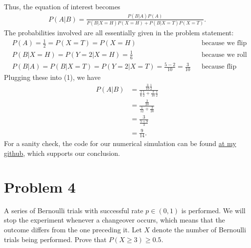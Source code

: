 \documentclass[10pt,a4paper]{article}
\theoremstyle{theorem}
\theoremstyle{definition}
\begin{document}
Thus, the equation of interest becomes
\begin{align}
P(A|B) = \frac{P(B|A) P(A)}{P(B| X = H) P(X = H) + P(B| X = T) P(X = T)}.
\end{align}
The probabilities involved are all essentially given in the problem statement:
\begin{align*}
&P(A) = \frac{1}{2} = P(X = T) = P(X = H) && \text{because we flip a fair coin}\\
&P(B|X = H) = P(Y = 2| X = H) = \frac{1}{6} && \text{because we roll a fair die}\\
&P(B|A) = P(B|X = T) = P(Y = 2| X = T) = \frac{5 - 2}{10} = \frac{3}{10} && \text{because flip our weighted die}
\end{align*}
Plugging these into (1), we have
\begin{align*}
P(A|B) &= \frac{\frac{3}{10} \frac{1}{2}}{\frac{1}{6}  \frac{1}{2} + \frac{3}{10} \frac{1}{2}}\\
&= \frac{\frac{3}{20}}{\frac{1}{12} + \frac{3}{20}}\\
&= \frac{3}{\frac{5 + 9}{3}}\\
&= \frac{9}{14}.
\end{align*}
For a sanity check, the code for our numerical simulation can be found \href{https://github.com/jeremiahgivens/MA-585-Probability/blob/main/HomeworkSolutions/Homework1/Homework1Problem3.py}{at my github}, which supports our conclusion.

\section*{Problem 4}
A series of Bernoulli trials with successful rate $p \in (0, 1)$ is performed. We will stop the
experiment whenever a changeover occurs, which means that the outcome differs from the
one preceding it. Let $X$ denote the number of Bernoulli trials being performed. Prove that
$P(X \geq 3) \geq 0.5$.
\end{document}
